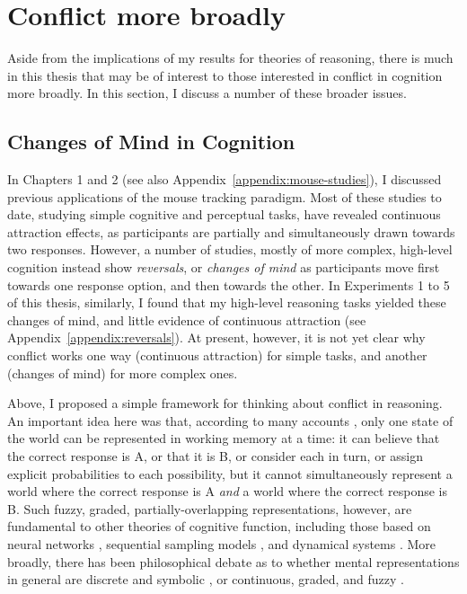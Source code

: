 
\section{Conflict more broadly}\label{subsec:ch7-broadly}

Aside from the implications of my results
for theories of reasoning,
there is much in this thesis that may be of interest
to those interested in conflict in cognition more broadly.
In this section, I discuss a number of these broader issues.

\subsection{Changes of Mind in Cognition}

In Chapters 1 and 2 (see also Appendix~\ref{appendix:mouse-studies}),
I discussed previous applications of the mouse tracking paradigm.
Most of these studies to date,
studying simple cognitive and perceptual tasks,
have revealed continuous attraction effects,
as participants are partially and simultaneously drawn towards two responses.
However, a number of studies,
mostly of more complex, high-level cognition
\citep[e.g.][]{Dale2011,Tomlinson2013,McKinstry2008,Barca2015}
instead show \emph{reversals}, or \emph{changes of mind}
as participants move first towards one response option,
and then towards the other.
In Experiments 1 to 5 of this thesis, similarly,
I found that my high-level reasoning tasks yielded these changes of mind,
and little evidence of continuous attraction
(see Appendix~\ref{appendix:reversals}).
At present, however, it is not yet clear why
conflict works one way (continuous attraction) for simple tasks,
and another (changes of mind) for more complex ones.

Above, I proposed a simple framework
for thinking about conflict in reasoning.
An important idea here was that,
according to many accounts
\citep{Evans1984,Evans2006,Johnson-Laird1983,Legrenzi1993,Mynatt1993,Baddeley2003},
only one state of the world can be represented in working memory at a time:
it can believe that the correct response is A, or that it is B,
or consider each in turn,
or assign explicit probabilities to each possibility,
but it cannot simultaneously represent
a world where the correct response is A
\emph{and} a world where the correct response is B.
Such fuzzy, graded, partially-overlapping representations, however,
are fundamental to other theories of cognitive function,
including those based on neural networks
\citep{McClelland2014,Rogers2004,McClelland1986a,Hinton2014,Kruschke1992},
sequential sampling models
\citep{Leite2010,Ratcliff2010,Ratcliff1978,Townsend1995,Usher2001},
and dynamical systems \citep{VanGelder1998,Port1995,Spivey2007,Freeman2011a}.
More broadly, there has been philosophical debate as to whether
mental representations in general are discrete and symbolic
\citep{Newell1972,Johnson-Laird1983,Johnson-Laird1991,Dietrich2003},
or continuous, graded, and fuzzy
\citep{Huette2012,Spivey2007,Beer1995,Port1995}.

